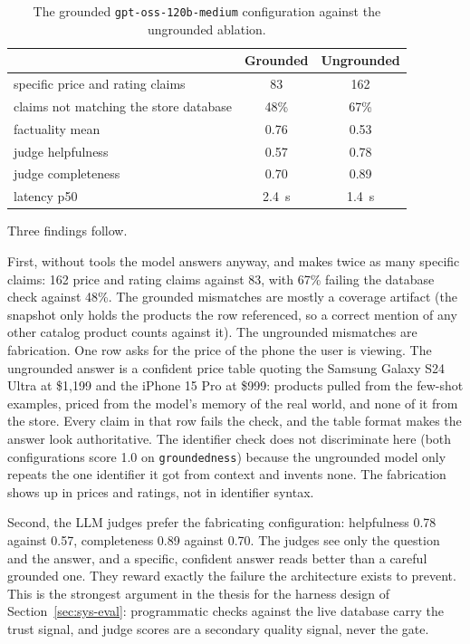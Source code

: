 \begin{table}[ht]
  \centering
  \footnotesize
  \begin{tabular}{lcc}
    \toprule
    & Grounded & Ungrounded \\
    \midrule
    specific price and rating claims & 83 & 162 \\
    claims not matching the store database & 48\% & 67\% \\
    factuality mean & 0.76 & 0.53 \\
    judge helpfulness & 0.57 & 0.78 \\
    judge completeness & 0.70 & 0.89 \\
    latency p50 & 2.4~s & 1.4~s \\
    \bottomrule
  \end{tabular}
  \caption{The grounded \texttt{gpt-oss-120b-medium}
  configuration against the ungrounded ablation.}
  \label{tab:results-ablation}
\end{table}

Three findings follow.

First, without tools the model answers anyway, and makes twice
as many specific claims: 162 price and rating claims against 83,
with 67\% failing the database check against 48\%. The grounded
mismatches are mostly a coverage artifact (the snapshot only
holds the products the row referenced, so a correct mention of
any other catalog product counts against it). The ungrounded
mismatches are fabrication. One row asks for the price of the
phone the user is viewing. The ungrounded answer is a confident
price table quoting the Samsung Galaxy S24 Ultra at \$1,199 and
the iPhone 15 Pro at \$999: products pulled from the few-shot
examples, priced from the model's memory of the real world, and
none of it from the store. Every claim in that row fails the
check, and the table format makes the answer look authoritative.
The identifier check does not discriminate here (both
configurations score 1.0 on \texttt{groundedness}) because the
ungrounded model only repeats the one identifier it got from
context and invents none. The fabrication shows up in prices and
ratings, not in identifier syntax.

Second, the LLM judges prefer the fabricating configuration:
helpfulness 0.78 against 0.57, completeness 0.89 against 0.70.
The judges see only the question and the answer, and a specific,
confident answer reads better than a careful grounded one. They
reward exactly the failure the architecture exists to prevent.
This is the strongest argument in the thesis for the harness
design of Section~\ref{sec:sys-eval}: programmatic checks
against the live database carry the trust signal, and judge
scores are a secondary quality signal, never the gate.

